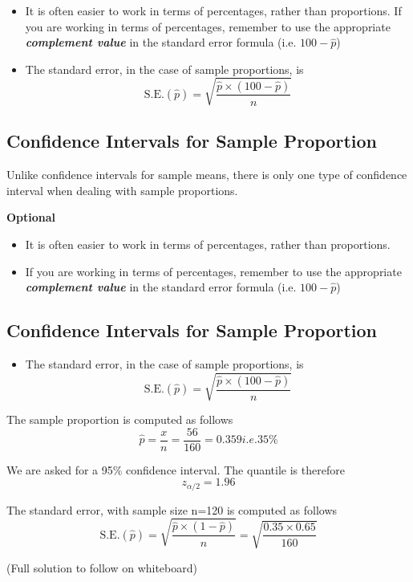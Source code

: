 \documentclass[a4paper,12pt]{article}
\begin{document}
\begin{itemize}

\item It is often easier to work in terms of percentages, rather than proportions.
If you are working in terms of percentages, remember to use the appropriate \textbf{\textit{complement value}} in the standard error formula (i.e. $100 - \hat{p}$)

\item The standard error, in the case of sample proportions, is
\[ \mbox{S.E.}(\hat{p}) = \sqrt{\frac{\hat{p}\times (100-\hat{p})}{n}}\]
\end{itemize}



\subsection*{Confidence Intervals for Sample Proportion}
Unlike confidence intervals for sample means, there is only one type of confidence interval when dealing with sample proportions.

\textbf{Optional}
\begin{itemize}

\item  It is often easier to work in terms of percentages, rather than proportions.
\item  If you are working in terms of percentages, remember to use the appropriate \textbf{\textit{complement value}} in the standard error formula (i.e. $100 - \hat{p}$)
\end{itemize}


\subsection*{Confidence Intervals for Sample Proportion}
\begin{itemize}
\item  The standard error, in the case of sample proportions, is
\[ \mbox{S.E.}(\hat{p}) = \sqrt{\frac{\hat{p}\times (100-\hat{p})}{n}}\] \smallskip


\end{itemize}



\begin{description}
\item[Point Estimate] The sample proportion is computed as follows
\[ \hat{p} = \frac{x}{n} = \frac{56}{160} = 0.35 9i.e. 35\%\]
\item[Quantile] We are asked for a 95\% confidence interval. The quantile is therefore
\[ z_{\alpha/2} =1.96\]
\item[Standard Error] The standard error, with sample size n=120 is computed as follows
\[ \mbox{S.E.}(\hat{p}) = \sqrt{\frac{\hat{p} \times (1-\hat{p})}{n}} =  \sqrt{\frac{0.35 \times 0.65}{160}}\]
\item (Full solution to follow on whiteboard)
\end{description}
\end{document}
